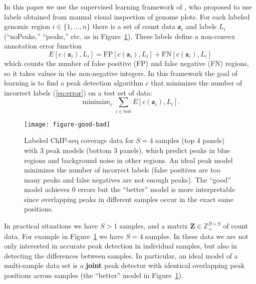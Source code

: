\documentclass{article} %
\DeclareMathOperator*{\minimize}{minimize}
\newcommand{\ZZ}{\mathbb Z}
\begin{document}
In this paper we use the supervised learning framework of
\citet{hocking2014visual}, who proposed to use labels obtained from
manual visual inspection of genome plots. For each labeled genomic
region $i\in\{1, \dots, n\}$ there is a set of count data $\mathbf
z_i$ and labels $L_i$ (``noPeaks,'' ``peaks,'' etc. as in
Figure~\ref{fig:good-bad}). These labels define a non-convex
annotation error function
\begin{equation}
  \label{eq:error}
  E[c(\mathbf z_i),  L_i] =
  \text{FP}[c(\mathbf z_i), L_i] +
  \text{FN}[c(\mathbf z_i), L_i]
\end{equation}
which counts the number of false positive (FP) and false negative (FN)
regions, so it takes values in the non-negative integers. In this
framework the goal of learning is to find a peak detection algorithm
$c$ that minimizes the number of incorrect labels (\ref{eq:error}) on
a test set of data:
\begin{equation}
  \label{eq:min_error}
  \minimize_c \sum_{i\in\text{test}} E[c(\mathbf z_i),  L_i].
\end{equation}

\begin{figure}[b!]
  \centering
  \texttt{[image: figure-good-bad]}
  \vskip -0.5cm
  \caption{Labeled ChIP-seq coverage data for $S=4$ samples (top 4
    panels) with 3 peak models (bottom 3 panels), which predict peaks 
    in blue regions and background noise in other regions.
    An ideal peak model minimizes the number of incorrect labels
    (false positives are too many peaks and false negatives are not
    enough peaks). The ``good'' model achieves 0 errors but the
    ``better'' model is more interpretable since overlapping peaks in
    different samples occur in the exact same positions.}
  \label{fig:good-bad}
\end{figure}

In practical situations we have $S>1$ samples, and a matrix $\mathbf
Z\in\ZZ_+^{B\times S}$ of count data. For example in
Figure~\ref{fig:good-bad} we have $S=4$ samples. In these data we are
not only interested in accurate peak detection in individual samples,
but also in detecting the differences between samples. In particular,
an ideal model of a multi-sample data set is a \textbf{joint} peak
detector with identical overlapping peak positions across samples (the
``better'' model in Figure~\ref{fig:good-bad}).
\end{document}
